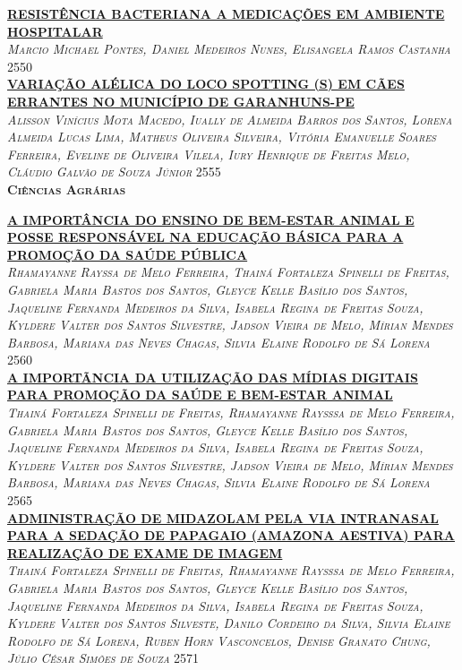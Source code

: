 \noindent \textsc{\hyperlink{trabalhos/248938.pdf.1}{\textbf{RESISTÊNCIA BACTERIANA A MEDICAÇÕES EM AMBIENTE HOSPITALAR}}}\\ 
\noindent \textsc{\textit{Marcio Michael Pontes, Daniel Medeiros Nunes, Elisangela Ramos Castanha}} \hfill 2550\\ 

\noindent \textsc{\hyperlink{trabalhos/251738.pdf.1}{\textbf{VARIAÇÃO ALÉLICA DO LOCO SPOTTING (S) EM CÃES ERRANTES NO MUNICÍPIO DE GARANHUNS-PE}}}\\ 
\noindent \textsc{\textit{Alisson Vinícius Mota Macedo, Iually de Almeida Barros dos Santos, Lorena Almeida Lucas Lima, Matheus Oliveira Silveira, Vitória Emanuelle Soares Ferreira, Eveline de Oliveira Vilela, Iury Henrique de Freitas Melo, Cláudio Galvão de Souza Júnior}} \hfill 2555\\ 


\vspace*{2cm} 
\noindent \textsc{\textbf{\LARGE Ciências Agrárias}}\\ 
\vspace*{1cm} 

\noindent \textsc{\hyperlink{trabalhos/248689.pdf.1}{\textbf{A IMPORTÂNCIA DO ENSINO DE BEM-ESTAR ANIMAL E POSSE RESPONSÁVEL NA EDUCAÇÃO BÁSICA PARA A PROMOÇÃO DA SAÚDE PÚBLICA}}}\\ 
\noindent \textsc{\textit{Rhamayanne Rayssa de Melo Ferreira, Thainá Fortaleza Spinelli de Freitas, Gabriela Maria Bastos dos Santos, Gleyce Kelle Basílio dos Santos, Jaqueline Fernanda Medeiros da Silva, Isabela Regina de Freitas Souza, Kyldere Valter dos Santos Silvestre, Jadson Vieira de Melo, Mírian Mendes Barbosa, Mariana das Neves Chagas, Silvia Elaine Rodolfo de Sá Lorena}} \hfill 2560\\ 

\noindent \textsc{\hyperlink{trabalhos/251783.pdf.1}{\textbf{A IMPORTÃNCIA DA UTILIZAÇÃO DAS MÍDIAS DIGITAIS PARA PROMOÇÃO DA SAÚDE E BEM-ESTAR ANIMAL}}}\\ 
\noindent \textsc{\textit{Thainá Fortaleza Spinelli de Freitas, Rhamayanne Raysssa de Melo Ferreira, Gabriela Maria Bastos dos Santos, Gleyce Kelle Basílio dos Santos, Jaqueline Fernanda Medeiros da Silva, Isabela Regina de Freitas Souza, Kyldere Valter dos Santos Silvestre, Jadson Vieira de Melo, Mírian Mendes Barbosa, Mariana das Neves Chagas, Silvia Elaine Rodolfo de Sá Lorena}} \hfill 2565\\ 

\noindent \textsc{\hyperlink{trabalhos/251654.pdf.1}{\textbf{ADMINISTRAÇÃO DE MIDAZOLAM PELA VIA INTRANASAL PARA A SEDAÇÃO DE PAPAGAIO (AMAZONA AESTIVA)  PARA REALIZAÇÃO DE EXAME DE IMAGEM}}}\\ 
\noindent \textsc{\textit{Thainá Fortaleza Spinelli de Freitas, Rhamayanne Raysssa de Melo Ferreira, Gabriela Maria Bastos dos Santos, Gleyce Kelle Basílio dos Santos, Jaqueline Fernanda Medeiros da Silva, Isabela Regina de Freitas Souza, Kyldere Valter dos Santos Silveste, Danilo Cordeiro da Silva, Silvia Elaine Rodolfo de Sá Lorena, Ruben Horn Vasconcelos, Denise Granato Chung, Júlio César Simões de Souza}} \hfill 2571\\ 

